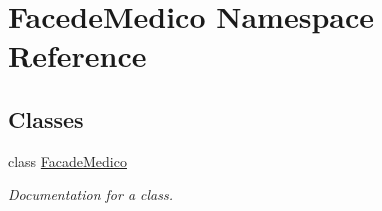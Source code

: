 \hypertarget{namespace_facede_medico}{}\section{Facede\+Medico Namespace Reference}
\label{namespace_facede_medico}
\subsection*{Classes}
\begin{DoxyCompactItemize}
\item 
class \mbox{\hyperlink{class_facede_medico_1_1_facade_medico}{Facade\+Medico}}
\begin{DoxyCompactList}\small\item\em Documentation for a class. \end{DoxyCompactList}\end{DoxyCompactItemize}
